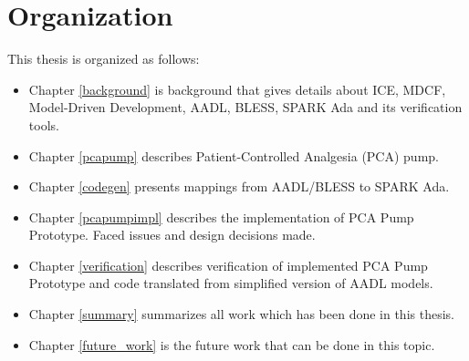 \section{Organization}
\label{introduction:organization}
This thesis is organized as follows:
\begin{itemize}
	\item Chapter \ref{background} is background that gives details about ICE, MDCF, Model-Driven Development, AADL, BLESS, SPARK Ada and its verification tools. 
	\item Chapter \ref{pcapump} describes Patient-Controlled Analgesia (PCA) pump.
	\item Chapter \ref{codegen} presents mappings from AADL/BLESS to SPARK Ada. 
	\item Chapter \ref{pcapumpimpl} describes the implementation of PCA Pump Prototype. Faced issues and design decisions made.
	\item Chapter \ref{verification} describes verification of implemented PCA Pump Prototype and code translated from simplified version of AADL models. 
	\item Chapter \ref{summary} summarizes all work which has been done in this thesis. 
	\item Chapter \ref{future_work} is the future work that can be done in this topic.
\end{itemize}

